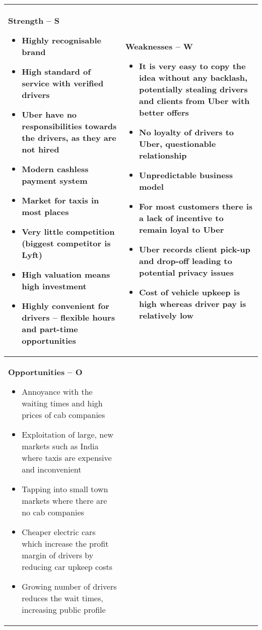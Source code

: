 \begin{tabular}{|p{7cm}|p{7cm}|}
  \hline
  \textbf{Strength -- S}
  \begin{itemize}[leftmargin=0.8em]
    \item Highly recognisable brand
    \item High standard of service with verified drivers
    \item Uber have no responsibilities towards the drivers, as they are not hired
    \item Modern cashless payment system
    \item Market for taxis in most places
    \item Very little competition (biggest competitor is Lyft)
    \item High valuation means high investment
    \item Highly convenient for drivers – flexible hours and part-time opportunities
  \end{itemize}
  &
  \textbf{Weaknesses -- W}
  \begin{itemize}[leftmargin=0.8em]
    \item It is very easy to copy the idea without any backlash, potentially stealing drivers and clients from Uber with better offers
    \item No loyalty of drivers to Uber, questionable relationship
    \item Unpredictable business model
    \item For most customers there is a lack of incentive to remain loyal to Uber
    \item Uber records client pick-up and drop-off leading to potential privacy issues
    \item Cost of vehicle upkeep is high whereas driver pay is relatively low
  \end{itemize}
  \\
  \hline
  \textbf{Opportunities -- O}
  \begin{itemize}[leftmargin=0.8em]
    \item Annoyance with the waiting times and high prices of cab companies
    \item Exploitation of large, new markets such as India where taxis are expensive and inconvenient
    \item Tapping into small town markets where there are no cab companies
    \item Cheaper electric cars which increase the profit margin of drivers by reducing car upkeep costs
    \item Growing number of drivers reduces the wait times, increasing public profile 

\end{itemize}
\end{tabular}
